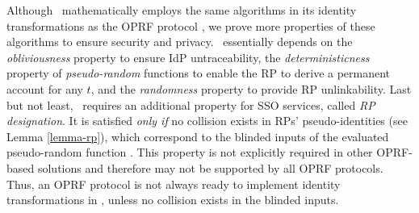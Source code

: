 Although \usso\ mathematically employs the same algorithms in its identity transformations as the OPRF protocol \cite{oprf-proved,voprf-proved}, we prove more properties of these algorithms to ensure security and privacy. %
\usso\ essentially depends on the \emph{obliviousness} property to ensure IdP untraceability, %
the \emph{deterministicness} property of \emph{pseudo-random} functions to enable the RP to derive a permanent account for any $t$, and the \emph{randomness} property to provide RP unlinkability. %
Last but not least, \usso\ requires an additional property for SSO services, called \emph{RP designation}.
It is satisfied \emph{only if} no collision exists in RPs' pseudo-identities (see Lemma \ref{lemma-rp}), which correspond to the blinded inputs of the evaluated pseudo-random function \cite{oprf-proved,voprf-proved}.
This property %
is not explicitly required in other OPRF-based solutions and therefore may not be supported by all OPRF protocols. Thus, an OPRF protocol is not always ready to implement identity transformations in \usso, unless no collision exists in the blinded inputs.

